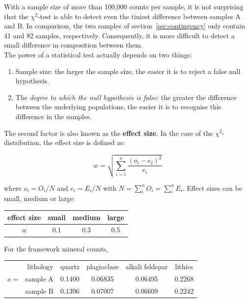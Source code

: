 With a sample size of more than 100,000 counts per sample, it is not
surprising that the $\chi^2$-test is able to detect even the tiniest
difference between samples A and B.  In comparison, the two samples of
section~\ref{sec:contingency} only contain 41 and 82 samples,
respectively. Consequently, it is more difficult to detect a small
difference in composition between them.\\

The power of a statistical test actually depends on two things:

\begin{enumerate}
  \item Sample size: the larger the sample size, the easier it is to
    reject a false null hypothesis.
  \item The \emph{degree to which the null hypothesis is false}: the
    greater the difference between the underlying populations, the
    easier it is to recognise this difference in the samples.
\end{enumerate}

The second factor is also known as the \textbf{effect size}. In the
case of the $\chi^2$-distribution, the effect size is defined as:

\begin{equation}
  w = \sqrt{\sum\limits_{i=1}^{n}\frac{\left(o_i-e_i\right)^2}{e_i}}
  \label{eq:effectsize}
\end{equation}

\noindent where $o_i=O_i/N$ and $e_i=E_i/N$ with
$N=\sum_{i}^{n}O_i=\sum_{i}^{n}E_i$.  Effect sizes can be small,
medium or large:

\begin{center}
  \begin{tabular}{c|ccc}
    effect size & small & medium & large \\ \hline
    $w$ & 0.1 & 0.3 & 0.5
  \end{tabular}
\end{center}

For the framework mineral counts,

\begin{center}
  \begin{tabular}{rr|cccc}
    & lithology & quartz & plagioclase & alkali feldspar & lithics  \\
    \cline{2-6}
    $o$ = & sample A & 0.1400 & 0.06835 & 0.06495 & 0.2268 \\
    & sample B & 0.1396 & 0.07007 & 0.06609 & 0.2242
  \end{tabular}
\end{center}

